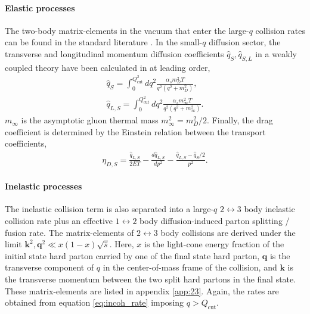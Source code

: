 \documentclass[aps, prc, reprint, amsmath, groupedaddress, nofootinbib]{revtex4-1}
\begin{document}
\paragraph{Elastic processes} The two-body matrix-elements in the vacuum that enter the large-$q$ collision rates can be found in the standard literature \cite{RevModPhys.59.465}.
In the small-$q$ diffusion sector, the transverse and longitudinal momentum diffusion coefficients $\hat{q}_S, \hat{q}_{S,L}$ in a weakly coupled theory have been calculated in \cite{Ghiglieri:2015ala} at leading order,
\begin{eqnarray}
\hat{q}_S = \int_0^{Q_{\textrm{cut}}^2} dq^2 \frac{\alpha_s m_D^2 T}{q^2 (q^2+m_D^2)},
\label{eq:qS} \\
\hat{q}_{L,S} = \int_0^{Q_{\textrm{cut}}^2} dq^2 \frac{\alpha_s m_\infty^2 T}{q^2 (q^2+m_\infty^2)}.
\label{eq:qSL}
\end{eqnarray}
$m_{\infty}$ is the asymptotic gluon thermal mass $m_{\infty}^2 = m_D^2/2$.
Finally, the drag coefficient is determined by the Einstein relation between the transport coefficients,
\begin{eqnarray}
\eta_{D,S} = \frac{\hat{q}_{L,S}}{2ET} - \frac{d\hat{q}_{L,S}}{dp^2} - \frac{\hat{q}_{L,S} - \hat{q}_S/2}{p^2}.
\end{eqnarray}

\paragraph{Inelastic processes} The inelastic collision term is also separated into a large-$q$ $2\leftrightarrow 3$ body inelastic collision rate plus an effective $1\leftrightarrow 2$ body diffusion-induced parton splitting / fusion rate.
The matrix-elements of $2\leftrightarrow 3$ body collisions are derived under the limit $\mathbf{k}^2, \mathbf{q}^2 \ll x(1-x)\sqrt{\hat{s}}$.
Here, $x$ is the light-cone energy fraction of the initial state hard parton carried by one of the final state hard parton, $\mathbf{q}$ is the transverse component of $q$ in the center-of-mass frame of the collision, and $\mathbf{k}$ is the transverse momentum between the two split hard partons in the final state. 
These matrix-elements are listed in appendix \ref{app:23}.
Again, the rates are obtained from equation \ref{eq:incoh_rate} imposing $q>Q_{\textrm{cut}}$.
\end{document}
